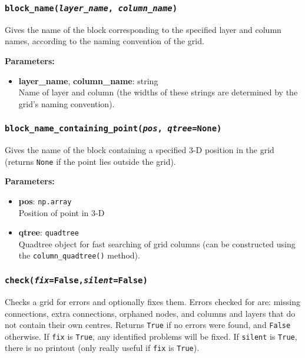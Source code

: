 \subsubsection{\texttt{block\_name(\emph{layer\_name}, \emph{column\_name})}}
\label{sec:block_name}

Gives the name of the block corresponding to the specified layer and column names, according to the naming convention of the grid.

\textbf{Parameters:}
\begin{itemize}
\item \textbf{layer\_name}, \textbf{column\_name}: string\\
  Name of layer and column (the widths of these strings are determined by the grid's naming convention).
\end{itemize}

\subsubsection{\texttt{block\_name\_containing\_point(\emph{pos}, \emph{qtree}=None)}}
\label{sec:block_name_containing_point}

Gives the name of the block containing a specified 3-D position in the grid (returns \texttt{None} if the point lies outside the grid).

\textbf{Parameters:}
\begin{itemize}
\item \textbf{pos}: \texttt{np.array}\\
  Position of point in 3-D
\item \textbf{qtree}: \texttt{quadtree}\\
  Quadtree object for fast searching of grid columns (can be constructed using the \texttt{column\_quadtree()} method).
\end{itemize}

\subsubsection{\texttt{check(\emph{fix}=False,\emph{silent}=False)}}
\label{sec:check}

Checks a grid for errors and optionally fixes them.  Errors checked for are: missing connections, extra connections, orphaned nodes, and columns and layers that do not contain their own centres.  Returns \texttt{True} if no errors were found, and \texttt{False} otherwise.  If \texttt{fix} is \texttt{True}, any identified problems will be fixed.  If \texttt{silent} is \texttt{True}, there is no printout (only really useful if \texttt{fix} is \texttt{True}).

